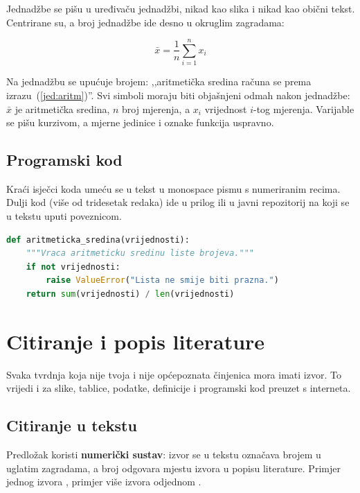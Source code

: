 \documentclass[12pt,a4paper,oneside]{report}
\begin{document}
Jednadžbe se pišu u uređivaču jednadžbi, nikad kao slika i nikad kao obični tekst. Centrirane su, a broj jednadžbe ide desno u okruglim zagradama:

\begin{equation}
  \bar{x} = \frac{1}{n}\sum_{i=1}^{n} x_i
  \label{jed:aritm}
\end{equation}

Na jednadžbu se upućuje brojem: ,,aritmetička sredina računa se prema izrazu~(\ref{jed:aritm})''. Svi simboli moraju biti objašnjeni odmah nakon jednadžbe: $\bar{x}$ je aritmetička sredina, $n$ broj mjerenja, a $x_i$ vrijednost $i$-tog mjerenja. Varijable se pišu kurzivom, a mjerne jedinice i oznake funkcija uspravno.

\section{Programski kod}

Kraći isječci koda umeću se u tekst u monospace pismu s numeriranim recima. Dulji kod (više od tridesetak redaka) ide u prilog ili u javni repozitorij na koji se u tekstu uputi poveznicom.

\begin{lstlisting}[language=Python,caption={Primjer isječka koda s potpisom ispod},label={kod:primjer}]
def aritmeticka_sredina(vrijednosti):
    """Vraca aritmeticku sredinu liste brojeva."""
    if not vrijednosti:
        raise ValueError("Lista ne smije biti prazna.")
    return sum(vrijednosti) / len(vrijednosti)
\end{lstlisting}

\chapter{Citiranje i popis literature}

Svaka tvrdnja koja nije tvoja i nije općepoznata činjenica mora imati izvor. To vrijedi i za slike, tablice, podatke, definicije i programski kod preuzet s interneta.

\section{Citiranje u tekstu}

Predložak koristi \textbf{numerički sustav}: izvor se u tekstu označava brojem u uglatim zagradama, a broj odgovara mjestu izvora u popisu literature. Primjer jednog izvora \citep{clanak2023}, primjer više izvora odjednom \citep{knjiga2021,konferencija2022,disertacija2020}.
\end{document}

